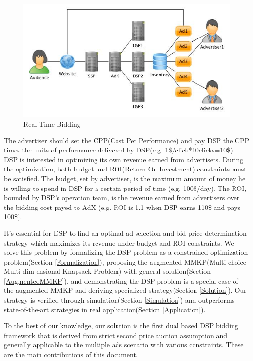 \documentclass{article}
\begin{document}
\begin{figure}[!h]
\centering
\includegraphics[width=1.0\linewidth]{./DSP.jpg}
\caption{Real Time Bidding}
\end{figure}

The advertiser should set the CPP(Cost Per Performance) and
    pay DSP the CPP times the units of performance delivered by DSP(e.g. 1\$/click*10clicks=10\$).
DSP is interested in optimizing its own revenue earned from advertisers.
During the optimization, both budget and ROI(Return On Investment) constraints must be satisfied.
The budget, set by advertiser, is the maximum amount of money he is willing to spend in DSP for a certain period of time (e.g. 100\$/day).
The ROI, bounded by DSP's operation team, is the revenue earned from advertisers over the bidding cost payed to AdX
    (e.g. ROI is 1.1 when DSP earns 110\$ and pays 100\$).

It's essential for DSP to find an optimal ad selection and bid price determination strategy
    which maximizes its revenue under budget and ROI constraints.
We solve this problem by
    formalizing the DSP problem as a constrained optimization problem(Section \ref{Formalization}),
    proposing the augmented MMKP(Multi-choice Multi-dim-ensional Knapsack Problem) with general solution(Section \ref{AugmentedMMKP}),
    and demonstrating the DSP problem is a special case of the augmented MMKP and deriving specialized strategy(Section \ref{Solution}).
Our strategy is verified through simulation(Section \ref{Simulation}) and
    outperforms state-of-the-art strategies in real application(Section \ref{Application}).

To the best of our knowledge, our solution is the first dual based DSP bidding framework
    that is derived from strict second price auction assumption and
    generally applicable to the multiple ads scenario with various constraints.
These are the main contributions of this document.
\end{document}
